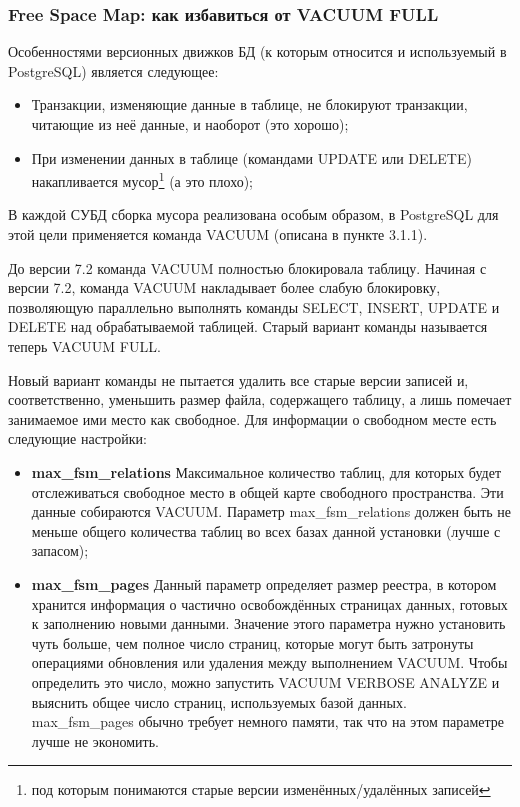 \subsubsection{Free Space Map: как избавиться от VACUUM FULL}

Особенностями версионных движков БД (к которым относится и используемый в PostgreSQL) является следующее:

\begin{itemize}
  \item Транзакции, изменяющие данные в таблице, не блокируют транзакции, читающие из неё данные, и наоборот (это хорошо);
  \item При изменении данных в таблице (командами UPDATE или DELETE) накапливается мусор\footnote{под которым понимаются старые версии изменённых/удалённых записей} (а это плохо);
\end{itemize}

В каждой СУБД сборка мусора реализована особым образом, в PostgreSQL для этой цели применяется команда VACUUM (описана в пункте 3.1.1).

До версии 7.2 команда VACUUM полностью блокировала таблицу. Начиная с версии 7.2, команда VACUUM накладывает более слабую блокировку, позволяющую параллельно выполнять команды SELECT, INSERT, UPDATE и DELETE над обрабатываемой таблицей. Старый вариант команды называется теперь VACUUM FULL.

Новый вариант команды не пытается удалить все старые версии записей и, соответственно, уменьшить размер файла, содержащего таблицу, а лишь помечает занимаемое ими место как свободное. Для информации о свободном месте есть следующие настройки:

\begin{itemize}
  \item \textbf{max\_fsm\_relations} Максимальное количество таблиц, для которых будет отслеживаться свободное место в общей карте свободного пространства. Эти данные собираются VACUUM. Параметр max\_fsm\_relations должен быть не меньше общего количества таблиц во всех базах данной установки (лучше с запасом);
  \item \textbf{max\_fsm\_pages} Данный параметр определяет размер реестра, в котором хранится информация о частично освобождённых страницах данных, готовых к заполнению новыми данными. Значение этого параметра нужно установить чуть больше, чем полное число страниц, которые могут быть затронуты операциями обновления или удаления между выполнением VACUUM. Чтобы определить это число, можно запустить VACUUM VERBOSE ANALYZE и выяснить общее число страниц, используемых базой данных. max\_fsm\_pages обычно требует немного памяти, так что на этом параметре лучше не экономить.
\end{itemize}


